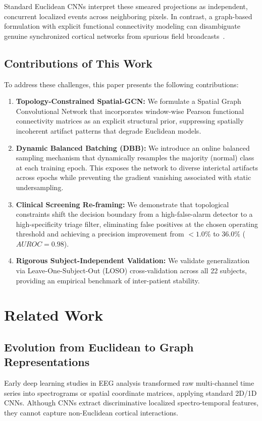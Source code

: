 \documentclass[journal]{IEEEtran}
\begin{document}
Standard Euclidean CNNs interpret these smeared projections as independent, concurrent localized events across neighboring pixels. In contrast, a graph-based formulation with explicit functional connectivity modeling can disambiguate genuine synchronized cortical networks from spurious field broadcasts~\cite{schoffelen}.

\subsection{Contributions of This Work}
To address these challenges, this paper presents the following contributions:
\begin{enumerate}
    \item \textbf{Topology-Constrained Spatial-GCN:} We formulate a Spatial Graph Convolutional Network that incorporates window-wise Pearson functional connectivity matrices as an explicit structural prior, suppressing spatially incoherent artifact patterns that degrade Euclidean models.
    \item \textbf{Dynamic Balanced Batching (DBB):} We introduce an online balanced sampling mechanism that dynamically resamples the majority (normal) class at each training epoch. This exposes the network to diverse interictal artifacts across epochs while preventing the gradient vanishing associated with static undersampling.
    \item \textbf{Clinical Screening Re-framing:} We demonstrate that topological constraints shift the decision boundary from a high-false-alarm detector to a high-specificity triage filter, eliminating false positives at the chosen operating threshold and achieving a precision improvement from $<1.0\%$ to $36.0\%$ ($AUROC = 0.98$).
    \item \textbf{Rigorous Subject-Independent Validation:} We validate generalization via Leave-One-Subject-Out (LOSO) cross-validation across all 22 subjects, providing an empirical benchmark of inter-patient stability.
\end{enumerate}

\section{Related Work}

\subsection{Evolution from Euclidean to Graph Representations}
Early deep learning studies in EEG analysis transformed raw multi-channel time series into spectrograms or spatial coordinate matrices, applying standard 2D/1D CNNs. Although CNNs extract discriminative localized spectro-temporal features, they cannot capture non-Euclidean cortical interactions. 
\end{document}
